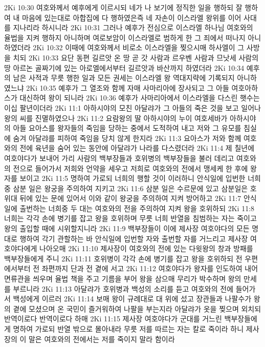 2Ki 10:30  여호와께서 예후에게 이르시되 네가 나 보기에 정직한 일을 행하되 잘 행하여 내 마음에 있는대로 아합집에 다 행하였은즉 네 자손이 이스라엘 왕위를 이어 사대를 지나리라 하시니라
2Ki 10:31  그러나 예후가 전심으로 이스라엘 하나님 여호와의 율법을 지켜 행하지 아니하며 여로보암이 이스라엘로 범하게 한 그 죄에서 떠나지 아니하였더라
2Ki 10:32  이때에 여호와께서 비로소 이스라엘을 찢으시매 하사엘이 그 사방을 치되
2Ki 10:33  요단 동편 길르앗 온 땅 곧 갓 사람과 르우벤 사람과 므낫세 사람의 땅 아르논 골짜기에 있는 아로엘에서부터 길르앗과 바산까지 하였더라
2Ki 10:34  예후의 남은 사적과 무릇 행한 일과 모든 권세는 이스라엘 왕 역대지략에 기록되지 아니하였느냐
2Ki 10:35  예후가 그 열조와 함께 자매 사마리아에 장사되고 그 아들 여호아하스가 대신하여 왕이 되니라
2Ki 10:36  예후가 사마리아에서 이스라엘을 다스린 햇수는 이십 팔년이더라
2Ki 11:1  아하시야의 모친 아달랴가 그 아들의 죽은 것을 보고 일어나 왕의 씨를 진멸하였으나
2Ki 11:2  요람왕의 딸 아하시야의 누이 여호세바가 아하시야의 아들 요아스를 왕자들의 죽임을 당하는 중에서 도적하여 내고 저와 그 유모를 침실에 숨겨 아달랴를 피하여 죽임을 당치 않게 한지라
2Ki 11:3  요아스가 저와 함께 여호와의 전에 육년을 숨어 있는 동안에 아달랴가 나라를 다스렸더라
2Ki 11:4  제 칠년에 여호야다가 보내어 가리 사람의 백부장들과 호위병의 백부장들을 불러 데리고 여호와의 전으로 들어가서 저희와 언약을 세우고 저희로 여호와의 전에서 맹세케 한 후에 왕자를 보이고
2Ki 11:5  명하여 가로되 너희의 행할 것이 이러하니 안식일에 입번한 너희중 삼분 일은 왕궁을 주의하여 지키고
2Ki 11:6  삼분 일은 수르문에 있고 삼분일은 호위대 뒤에 있는 문에 있어서 이와 같이 왕궁을 주의하여 지켜 방어하고
2Ki 11:7  안식일에 출번하는 너희중 두 대는 여호와의 전을 주의하여 지켜 왕을 호위하되
2Ki 11:8  너희는 각각 손에 병기를 잡고 왕을 호위하며 무릇 너희 반열을 침범하는 자는 죽이고 왕의 출입할 때에 시위할지니라
2Ki 11:9  백부장들이 이에 제사장 여호야다의 모든 명대로 행하여 각기 관할하는 바 안식일에 입번할 자와 출번할 자를 거느리고 제사장 여호야다에게 나아오매
2Ki 11:10  제사장이 여호와의 전에 있는 다윗왕의 창과 방패를 백부장들에게 주니
2Ki 11:11  호위병이 각각 손에 병기를 잡고 왕을 호위하되 전 우편에서부터 전 좌편까지 단과 전 곁에 서고
2Ki 11:12  여호야다가 왕자를 인도하여 내어 면류관을 씌우며 율법 책을 주고 기름을 부어 왕을 삼으매 무리가 박수하며 왕의 만세를 부르니라
2Ki 11:13  아달랴가 호위병과 백성의 소리를 듣고 여호와의 전에 들어가서 백성에게 이르러
2Ki 11:14  보매 왕이 규례대로 대 위에 섰고 장관들과 나팔수가 왕의 곁에 모셨으며 온 국민이 즐거워하여 나팔을 부는지라 아달랴가 옷을 찢으며 외치되 반역이로다 반역이로다 하매
2Ki 11:15  제사장 여호야다가 군대를 거느린 백부장들에게 명하여 가로되 반열 밖으로 몰아내라 무릇 저를 따르는 자는 칼로 죽이라 하니 제사장의 이 말은 여호와의 전에서는 저를 죽이지 말라 함이라
